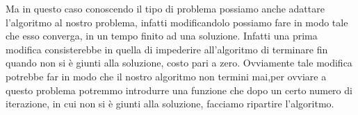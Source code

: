 		Ma in questo caso conoscendo il tipo di problema possiamo anche adattare l'algoritmo al nostro problema, infatti modificandolo possiamo fare in modo tale che esso converga, in un tempo finito ad una soluzione.
		Infatti una prima modifica consisterebbe in quella di impederire all'algoritmo di terminare fin quando non si è giunti alla soluzione, costo pari a zero.
		Ovviamente tale modifica potrebbe far in modo che il nostro algoritmo non termini mai,per ovviare a questo problema potremmo introdurre una funzione che dopo un certo numero di iterazione, in cui non si è giunti alla soluzione, facciamo ripartire l'algoritmo.
		